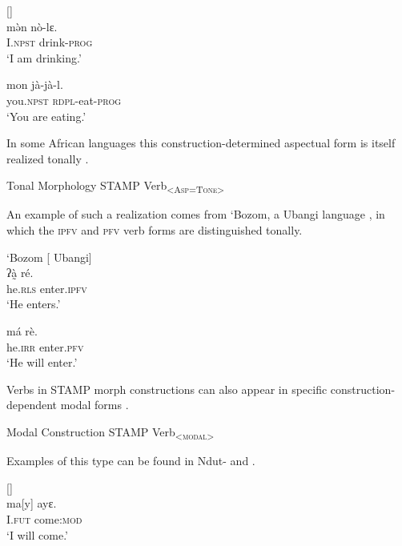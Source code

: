 \documentclass[output=paper]{langsci/langscibook}
\begin{document}
\ea\label{ex:anderson:20}
   \citep[197]{Jungraithmayr1968}        []\\
\ea\label{ex:anderson:20a}
\gll m\`ən  nò-lɛ.\\
  I.\textsc{npst}  drink-\textsc{prog}        \\
\glt `I am drinking.'         

\ex \label{ex:anderson:20b}
\gll  mon    jà-jà-l. \\
  you.\textsc{npst}  \textsc{rdpl}-eat-\textsc{prog}\\
\glt `You are eating.'
\z
\z 

In some African languages this construction-determined aspectual form is itself realized tonally .

\ea\label{ex:anderson:21}
  Tonal Morphology  STAMP   Verb\textsc{\textsubscript{<Asp=Tone>}}
\z

An example of such a realization comes from `Bozom, a  Ubangi language , in which the \textsc{ipfv} and \textsc{pfv} verb forms are distinguished tonally.

\ea\label{ex:anderson:22}
`Bozom   \citep[159]{Monino1995}        [ Ubangi]\\
\ea\label{ex:anderson:22a}
\gll ʔà̰    ré.  \\
  he\textsc{.rls}     enter.\textsc{ipfv}\\
\glt `He enters.' 

\ex \label{ex:anderson:22b}
\gll  má  rè. \\
  he\textsc{.irr}  enter\textsc{.pfv}\\
\glt `He will enter.'
\z
\z

Verbs in STAMP morph constructions can also appear in specific construction-de\-pen\-dent modal forms . 


\ea\label{ex:anderson:23}
Modal Construction  STAMP  Verb\textsubscript{<}\textsc{\textsubscript{modal}}\textsubscript{>}\\
\z

Examples of this type can be found in Ndut-  and  .

\ea\label{ex:anderson:24}
 \citep[Ndut- 4]{Pichl1973}      []\\
\gll ma[y]  ayɛ.\\
I.\textsc{fut}  come:\textsc{mod}  \\
\glt `I will come.' 
\z
\end{document}
